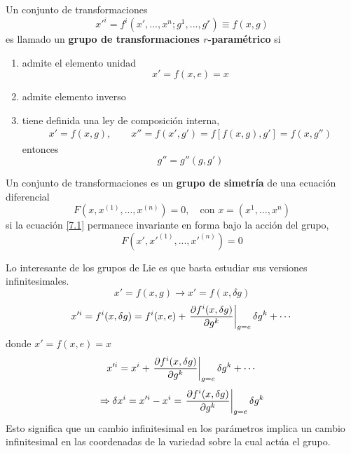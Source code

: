 \begin{defi}
	Un conjunto de transformaciones
	\begin{equation}
  x'^{i}=f^{i}(x',...,x^n;g^1,...,g^r)\equiv f(x,g)
\end{equation}
es llamado un \textbf{grupo de transformaciones $r$-paramétrico} si
\begin{enumerate}
	\item admite el elemento unidad
\begin{equation}
  x'=f(x,e)=x
\end{equation}
\item admite elemento inverso
\item tiene definida una ley de composición interna,
\begin{align}
  x'=f(x,g),\qquad x''=f(x',g')=f[f(x,g),g']=f(x,g'')
\end{align}
entonces 
\begin{equation}
  \boxed{g''=g''(g,g')}
\end{equation}
\end{enumerate}
\end{defi}
%
\begin{defi}
	Un conjunto de transformaciones es un \textbf{grupo de simetría} de una ecuación diferencial
	\begin{equation}\label{7.1}
  F(x,x^{(1)},...,x^{(n)})=0,\quad \text{con }x=(x^1,...,x^n)
\end{equation}
si la ecuación \eqref{7.1} permanece invariante en forma bajo la acción del grupo,
\begin{equation}
  F(x',x'^{(1)},...,x'^{(n)})=0
\end{equation}
\end{defi}

Lo interesante de los grupos de Lie es que basta estudiar sus versiones infinitesimales.
\begin{equation}
  x'=f(x,g)\to x'=f(x,\delta g)
\end{equation}
\begin{equation}
  x'^{i}=f^{i}(x,\delta g)=f^{i}(x,e)+\eval{\pdv{f^{i}(x,\delta g)}{g^k}}_{g=e}\delta g^k+\cdots
\end{equation}
donde $x'=f(x,e)=x$
\begin{equation}
  x'^{i}=x^{i}+\eval{\pdv{f^{i}(x,\delta g)}{g^k}}_{g=e}\delta g^k+\cdots
\end{equation}
\begin{equation}
  \Rightarrow \delta x^{i}=x'^{i}-x^{i}=\eval{\pdv{f^{i}(x,\delta g)}{g^k}}_{g=e}\delta g^k
\end{equation}
Esto significa que un cambio infinitesimal en los parámetros implica un cambio infinitesimal en las coordenadas de la variedad sobre la cual actúa el grupo.





















